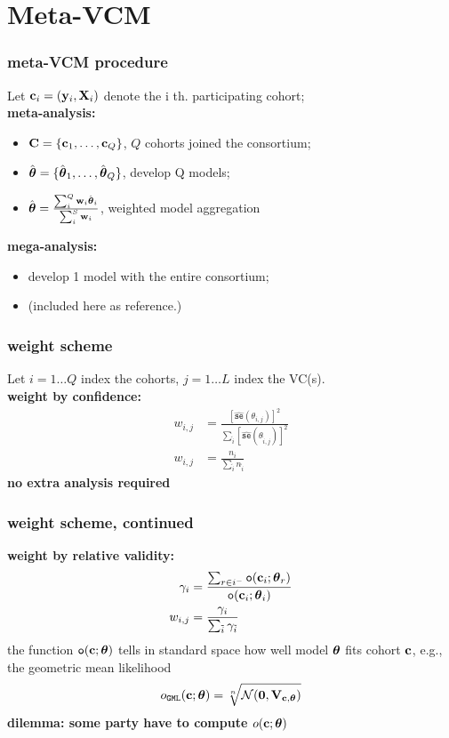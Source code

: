 \documentclass{beamer}
\begin{document}
\section{Meta-VCM}
\begin{frame}\frametitle{meta-VCM procedure}
  Let $\mathbf{c}_i=(\mathbf{y}_i, \mathbf{X}_i)$ denote the i th. participating cohort; \\
  \textbf{{\color{red}meta}-analysis:}
  \begin{itemize}
  \item $\mathbf{C} = \{\mathbf{c}_1, \dots, \mathbf{c}_Q \}$, $Q$ cohorts joined the consortium;
  \item $\hat{\boldsymbol{\theta}}=\{\hat{\boldsymbol{\theta}}_1, \dots, \hat{\boldsymbol{\theta}}_Q\}$, develop Q models;
  \item $\hat{\boldsymbol{\theta}} = \frac{\sum_i^Q \mathbf{w}_i
      \hat{\boldsymbol{\theta}}_i}{\sum_i^S \mathbf{w}_i}$, weighted model aggregation
  \end{itemize}
  \textbf{{\color{red}mega}-analysis:}
  \begin{itemize}
  \item develop 1 model with the entire consortium;
  \item (included here as reference.)
  \end{itemize}
\end{frame}
\newcommand{\se}[1]{\hat{\mathtt{se}}\left(#1\right)}
\newcommand{\ti}{{\tilde{i}}}
\newcommand{\ef}{{\mathtt{o}}}
\begin{frame}\frametitle{weight scheme}
  Let $i = 1 \dots Q$ index the cohorts, $j = 1 \dots L$ index the VC(s).\\
  \textbf{weight by confidence:}
  \begin{align}
    w_{i,j} &= \frac{\left[\se{\theta_{i,j}} \right ]^2}
    {\sum_\ti \left[\se{\theta_{\ti,j}} \right ]^2} \\
    w_{i,j} &= \frac{n_i}{\sum_\ti n_\ti}
  \end{align}
  {\color{blue}\textbf{no extra analysis required}}
\end{frame}
\begin{frame}\frametitle{weight scheme, continued}
  \textbf{weight by relative validity:}
  \begin{align}
    \gamma_i &= \frac{\sum_{r \in i^-}{\ef( \vc_i; \vtheta_r)}}
    {\ef(\vc_i; \vtheta_i)} \\
    w_{i,j}  &= \frac{\gamma_i}{\sum_\ti \gamma_\ti}
  \end{align}
  the function $\ef(\vc;\vtheta)$ tells in standard space how well
  model $\boldsymbol{\theta}$ fits cohort $\mathbf{c}$, e.g., the geometric mean
  likelihood
  \begin{align}
    o_\mathtt{GML}(\mathbf{c}; \boldsymbol{\theta}) = \sqrt[n]{\mathcal{N}(\boldsymbol{0}, \mathbf{V}_{\mathbf{c}, \boldsymbol{\theta}})}
  \end{align}
  {\color{red}\textbf{dilemma: some party have to compute $o(\mathbf{c}; \boldsymbol{\theta})$}}
\end{frame}
\end{document}
